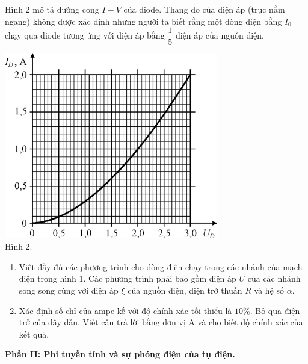 \begin{vd}
\begin{center}
 \end{center}
 Hình 2 mô tả đường cong $I - V$ của diode. Thang đo của điện áp (trục nằm ngang) không được xác định nhưng người ta biết rằng một dòng điện bằng $I_0$ chạy qua diode tương ứng với điện áp bằng $\dfrac{1}{5}$ điện áp của nguồn điện. 
 \begin{center}
    \includegraphics[width=0.7\textwidth]{Anh/iom1.pdf}
     \\Hình 2.
 \end{center}
\begin{enumerate}[1)]
    \item Viết đầy đủ các phương trình cho dòng điện chạy trong các nhánh của mạch điện trong hình 1. Các phương trình phải bao gồm điện áp $U$ của các nhánh song song cùng với điện áp $\xi$ của nguồn điện, điện trở thuần $R$ và hệ số $\alpha$.
    \item Xác định số chỉ của ampe kế với độ  chính xác tối thiểu là $10 \%$. Bỏ qua điện trở của dây dẫn. Viết câu trả lời bằng đơn vị $\mathrm{A}$ và cho biết độ chính xác của kết quả.
\end{enumerate}
\begin{center}
    \bf Phần II: Phi tuyến tính và sự phóng điện của tụ điện.
\end{center}
{



\begin{tikzpicture}[x=0.75pt,y=0.75pt,yscale=-1,xscale=1]


\end{tikzpicture}}
\end{vd}

